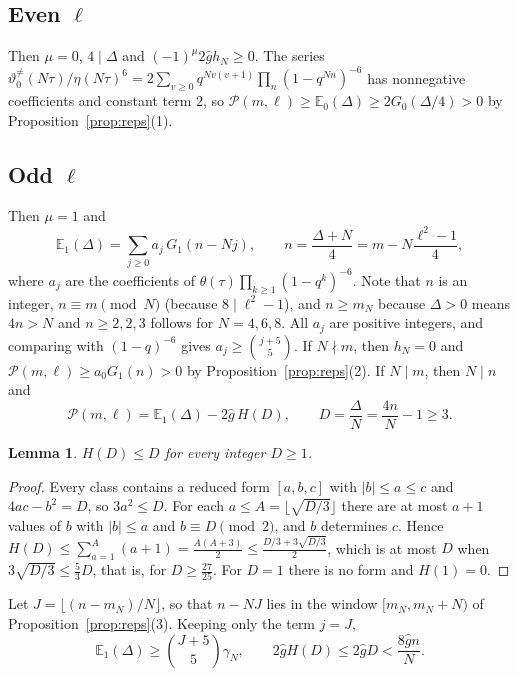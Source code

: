 \documentclass[11pt]{amsart}
\newtheorem{lemma}[theorem]{Lemma}
\theoremstyle{definition}
\newcommand{\gh}{\hat g}
\newcommand{\vtn}{\vartheta^{\neq}}
\begin{document}
\subsection*{Even \texorpdfstring{$\ell$}{l}} Then $\mu=0$, $4\mid\Delta$ and $(-1)^\mu2\gh h_N\ge0$. The series $\vtn_0(N\tau)/\eta(N\tau)^6=2\sum_{v\ge0}q^{Nv(v+1)}\prod_n(1-q^{Nn})^{-6}$ has nonnegative coefficients and constant term $2$, so $\mathcal P(m,\ell)\ge\mathbb E_0(\Delta)\ge2G_0(\Delta/4)>0$ by Proposition~\ref{prop:reps}(1).

\subsection*{Odd \texorpdfstring{$\ell$}{l}} Then $\mu=1$ and
\[
\mathbb E_1(\Delta)=\sum_{j\ge0}a_j\,G_1(n-Nj),\qquad n=\frac{\Delta+N}4=m-N\frac{\ell^2-1}4,
\]
where $a_j$ are the coefficients of $\theta(\tau)\prod_{k\ge1}(1-q^k)^{-6}$. Note that $n$ is an integer, $n\equiv m\pmod N$ (because $8\mid\ell^2-1$), and $n\ge m_N$ because $\Delta>0$ means $4n>N$ and $n\ge2,2,3$ follows for $N=4,6,8$. All $a_j$ are positive integers, and comparing with $(1-q)^{-6}$ gives $a_j\ge\binom{j+5}5$. If $N\nmid m$, then $h_N=0$ and $\mathcal P(m,\ell)\ge a_0G_1(n)>0$ by Proposition~\ref{prop:reps}(2). If $N\mid m$, then $N\mid n$ and
\[
\mathcal P(m,\ell)=\mathbb E_1(\Delta)-2\gh\,H(D),\qquad D=\frac\Delta N=\frac{4n}N-1\ge3 .
\]

\begin{lemma}\label{lem:H}
$H(D)\le D$ for every integer $D\ge1$.
\end{lemma}

\begin{proof}
Every class contains a reduced form $[a,b,c]$ with $|b|\le a\le c$ and $4ac-b^2=D$, so $3a^2\le D$. For each $a\le A=\lfloor\sqrt{D/3}\rfloor$ there are at most $a+1$ values of $b$ with $|b|\le a$ and $b\equiv D\pmod2$, and $b$ determines $c$. Hence $H(D)\le\sum_{a=1}^A(a+1)=\frac{A(A+3)}2\le\frac{D/3+3\sqrt{D/3}}2$, which is at most $D$ when $3\sqrt{D/3}\le\frac53D$, that is, for $D\ge\frac{27}{25}$. For $D=1$ there is no form and $H(1)=0$.
\end{proof}

Let $J=\lfloor(n-m_N)/N\rfloor$, so that $n-NJ$ lies in the window $[m_N,m_N+N)$ of Proposition~\ref{prop:reps}(3). Keeping only the term $j=J$,
\begin{equation}\label{eq:lower}
\mathbb E_1(\Delta)\ge\binom{J+5}5\gamma_N,\qquad 2\gh H(D)\le2\gh D<\frac{8\gh n}N .
\end{equation}
\end{document}
